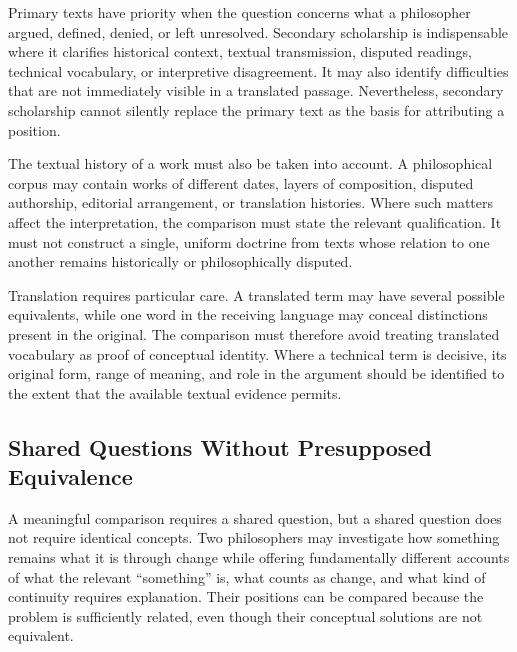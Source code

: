 \label{para:VS.B01.P01.C08.S01.SS02.P003}
Primary texts have priority when the question concerns what a
philosopher argued, defined, denied, or left unresolved.
Secondary scholarship is indispensable where it clarifies
historical context, textual transmission, disputed readings,
technical vocabulary, or interpretive disagreement. It may
also identify difficulties that are not immediately visible
in a translated passage. Nevertheless, secondary scholarship
cannot silently replace the primary text as the basis for
attributing a position.

\label{para:VS.B01.P01.C08.S01.SS02.P004}
The textual history of a work must also be taken into account.
A philosophical corpus may contain works of different dates,
layers of composition, disputed authorship, editorial
arrangement, or translation histories. Where such matters
affect the interpretation, the comparison must state the
relevant qualification. It must not construct a single,
uniform doctrine from texts whose relation to one another
remains historically or philosophically disputed.

\label{para:VS.B01.P01.C08.S01.SS02.P005}
Translation requires particular care. A translated term may
have several possible equivalents, while one word in the
receiving language may conceal distinctions present in the
original. The comparison must therefore avoid treating
translated vocabulary as proof of conceptual identity. Where
a technical term is decisive, its original form, range of
meaning, and role in the argument should be identified to the
extent that the available textual evidence permits.

\subsection{Shared Questions Without Presupposed Equivalence}
\label{sec:ch08-s01-ss03}

\label{para:VS.B01.P01.C08.S01.SS03.P001}
A meaningful comparison requires a shared question, but a
shared question does not require identical concepts. Two
philosophers may investigate how something remains what it is
through change while offering fundamentally different
accounts of what the relevant ``something'' is, what counts
as change, and what kind of continuity requires explanation.
Their positions can be compared because the problem is
sufficiently related, even though their conceptual solutions
are not equivalent.

